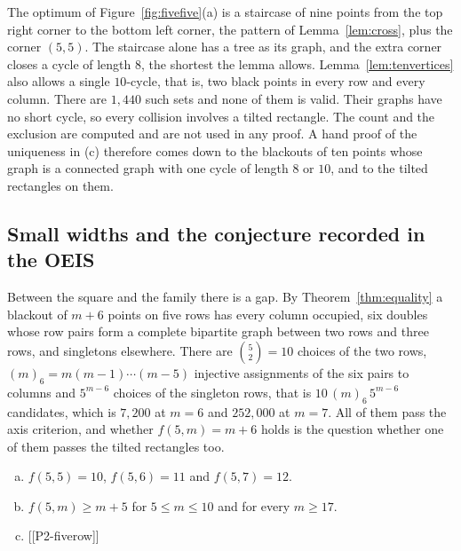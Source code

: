 The optimum of Figure~\ref{fig:fivefive}(a) is a staircase of nine points from the top right
corner to the bottom left corner, the pattern of Lemma~\ref{lem:cross}, plus the corner
$(5,5)$. The staircase alone has a tree as its graph, and the extra corner closes a cycle of
length $8$, the shortest the lemma allows. Lemma~\ref{lem:tenvertices} also allows a single
$10$-cycle, that is, two black points in every row and every column. There are $1{,}440$
such sets and none of them is valid. Their graphs have no short cycle, so every collision
involves a tilted rectangle. The count and the exclusion are computed and are not used in any
proof. A
hand proof of the uniqueness in (c) therefore comes down to the blackouts of ten points whose
graph is a connected graph with one cycle of length $8$ or $10$, and to the tilted rectangles
on them.

\subsection{Small widths and the conjecture recorded in the OEIS}

Between the square and the family there is a gap. By Theorem~\ref{thm:equality} a blackout of
$m+6$ points on five rows has every column occupied, six doubles whose row pairs form a complete
bipartite graph between two rows and three rows, and singletons elsewhere. There are
$\binom52=10$ choices of the two rows, $(m)_6=m(m-1)\cdots(m-5)$ injective assignments of
the six pairs to columns and $5^{m-6}$ choices of the singleton rows, that is
$10\,(m)_6\,5^{m-6}$ candidates, which is $7{,}200$ at $m=6$ and $252{,}000$ at $m=7$. All of
them pass the axis criterion, and whether $f(5,m)=m+6$ holds is the question whether one of
them passes the tilted rectangles too.

\begin{proposition}\label{prop:fivesmall}
\begin{enumerate}[(a)]
\item $f(5,5)=10$, $f(5,6)=11$ and $f(5,7)=12$.
\item $f(5,m)\ge m+5$ for $5\le m\le10$ and for every $m\ge17$.
\item {}[[P2-fiverow]]
\end{enumerate}
\end{proposition}

